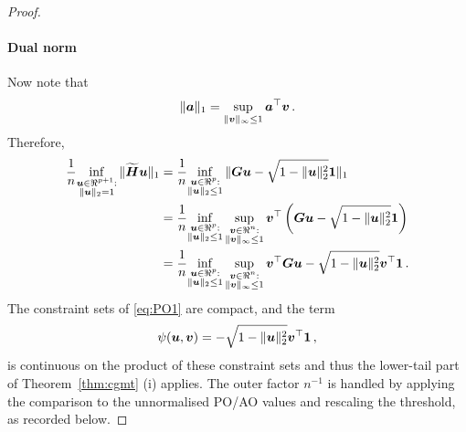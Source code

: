 \documentclass{article}
\makeatletter
\theoremstyle{definition}
\newcommand{\vnorm}[1]{%
	\ensuremath{%
		\if@display
		\left\| #1 \right\|
		\else
		\| #1 \|
		\fi
	}%
}
\newcommand*{\bb}{\boldsymbol}
\def\bH {\bb{H}}
\def\bu{\bb{u}}
\def\bv{\bb{v}}
\def\bH{\bb{H}}
\makeatother
\begin{document}
\begin{bibunit}
\begin{proof}
	\paragraph*{Dual norm}
	Now note that
	$$
	\vnorm{\bb a}_1 = \underset{\vnorm{\bv}_\infty \leq 1}{\sup} \, \bb a^\top \bv \,.
	$$
	Therefore,
	\begin{equation}
		\begin{aligned} \label{eq:PO1}
	\frac{1}{n}\underset{\substack{\bu \in \Re^{p + 1}: \\ \vnorm{\bu}_2 = 1}}{\inf}\, \vnorm{\widetilde{\bH} \bu}_1
	&= \frac{1}{n}\underset{\substack{\bu \in \Re^{p}: \\ \vnorm{\bu}_2 \leq 1}}{\inf}\, \vnorm{\bb G \bu - \sqrt{1 - \vnorm{\bu}_2^2} \bb 1}_1 \\
	&= \frac{1}{n}\underset{\substack{\bu \in \Re^{p }: \\ \vnorm{\bu}_2 \leq 1}}{\inf} \, \underset{\substack{\bv \in \Re^{n}:\\ \vnorm{\bv}_\infty \leq 1}}{\sup} \, \bv^\top  \left( \bb G \bu - \sqrt{1 - \vnorm{\bu}_2^2} \bb 1\right) \\
		&= \frac{1}{n}\underset{\substack{\bu \in \Re^{p }: \\ \vnorm{\bu}_2 \leq 1}}{\inf}\, \underset{\substack{\bv \in \Re^{n}:\\ \vnorm{\bv}_\infty \leq 1}}{\sup} \, \bv^\top   \bb G \bu - \sqrt{1 - \vnorm{\bu}_2^2} \bv^\top \bb 1 \,.
	\end{aligned}
	\end{equation}
	The constraint sets of \eqref{eq:PO1} are compact, and the term
	$$
	\psi(\bu, \bv) = - \sqrt{1 - \vnorm{\bu}_2^2} \bv^\top \bb 1\,,
	$$
	is continuous on the product of these constraint sets and thus the lower-tail part of Theorem~\ref{thm:cgmt} (i) applies. 
	The outer factor $n^{-1}$ is handled by applying the comparison to the 
	unnormalised PO/AO values and rescaling the threshold, as recorded 
	below.

\end{proof}
\end{bibunit}
\end{document}
